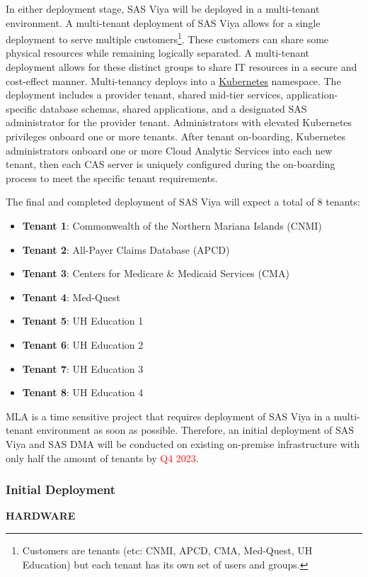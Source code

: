 In either deployment stage, SAS Viya will be deployed in a multi-tenant environment. A multi-tenant deployment of SAS Viya allows for a single deployment to serve multiple customers\footnote{Customers are tenants (etc: CNMI, APCD, CMA, Med-Quest, UH Education) but each tenant has its own set of users and groups.}. These customers can share some physical resources while remaining logically separated. A multi-tenant deployment allows for these distinct groups to share IT resources in a secure and cost-effect manner. Multi-tenancy deploys into a \href{https://kubernetes.io/}{Kubernetes} namespace. The deployment includes a provider tenant, shared mid-tier services, application-specific database schemas, shared applications, and a designated SAS administrator for the provider tenant. Administrators with elevated Kubernetes privileges onboard one or more tenants. After tenant on-boarding, Kubernetes administrators onboard one or more Cloud Analytic Services into each new tenant, then each CAS server is uniquely configured during the on-boarding process to meet the specific tenant requirements. 

The final and completed deployment of SAS Viya will expect a total of 8 tenants:

\begin{itemize}
    \item \textbf{Tenant 1}: Commonwealth of the Northern Mariana Islands (CNMI)
    \item \textbf{Tenant 2}: All-Payer Claims Database (APCD)
    \item \textbf{Tenant 3}: Centers for Medicare \& Medicaid Services (CMA)
    \item \textbf{Tenant 4}: Med-Quest
    \item \textbf{Tenant 5}: UH Education 1
    \item \textbf{Tenant 6}: UH Education 2
    \item \textbf{Tenant 7}: UH Education 3
    \item \textbf{Tenant 8}: UH Education 4
\end{itemize}


MLA is a time sensitive project that requires deployment of SAS Viya in a multi-tenant environment as soon as possible. Therefore, an initial deployment of SAS Viya and SAS DMA will be conducted on existing on-premise infrastructure with only half the amount of tenants by \textcolor{red}{Q4 2023}. 

\subsubsection{Initial Deployment}
\textbf{HARDWARE}

